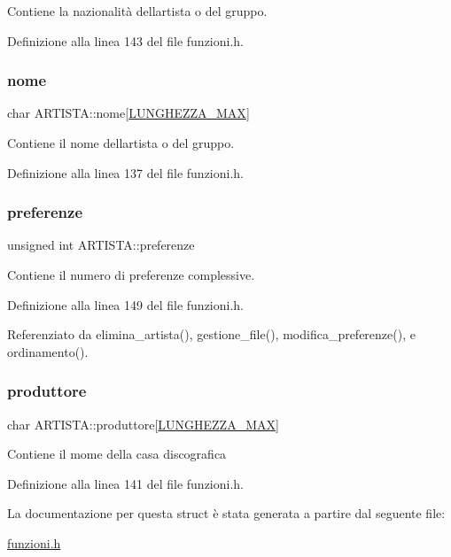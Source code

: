Contiene la nazionalità dell\textquotesingle{}artista o del gruppo. 

Definizione alla linea 143 del file funzioni.\+h.

\mbox{\label{struct_a_r_t_i_s_t_a_a8ddd53b0e7cbe5f893e13b26a0203005}} 
\subsubsection{\texorpdfstring{nome}{nome}}
{\footnotesize\ttfamily char A\+R\+T\+I\+S\+T\+A\+::nome\mbox{[}\mbox{\hyperlink{funzioni_8h_a2cdd71b92d6e869f8b094e32a6da6a62}{L\+U\+N\+G\+H\+E\+Z\+Z\+A\+\_\+\+M\+AX}}\mbox{]}}

Contiene il nome dell\textquotesingle{}artista o del gruppo. 

Definizione alla linea 137 del file funzioni.\+h.

\mbox{\label{struct_a_r_t_i_s_t_a_a864c672ed1a5c81d1daf02093e11eb05}} 
\subsubsection{\texorpdfstring{preferenze}{preferenze}}
{\footnotesize\ttfamily unsigned int A\+R\+T\+I\+S\+T\+A\+::preferenze}

Contiene il numero di preferenze complessive. 

Definizione alla linea 149 del file funzioni.\+h.



Referenziato da elimina\+\_\+artista(), gestione\+\_\+file(), modifica\+\_\+preferenze(), e ordinamento().

\mbox{\label{struct_a_r_t_i_s_t_a_a444c256b4120246fcbf1804377e61e32}} 
\subsubsection{\texorpdfstring{produttore}{produttore}}
{\footnotesize\ttfamily char A\+R\+T\+I\+S\+T\+A\+::produttore\mbox{[}\mbox{\hyperlink{funzioni_8h_a2cdd71b92d6e869f8b094e32a6da6a62}{L\+U\+N\+G\+H\+E\+Z\+Z\+A\+\_\+\+M\+AX}}\mbox{]}}

Contiene il mome della casa discografica 

Definizione alla linea 141 del file funzioni.\+h.



La documentazione per questa struct è stata generata a partire dal seguente file\+:\begin{DoxyCompactItemize}
\item 
\mbox{\hyperlink{funzioni_8h}{funzioni.\+h}}\end{DoxyCompactItemize}
